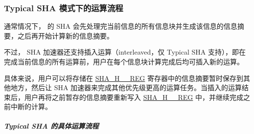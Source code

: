 \documentclass[main\_\_CN.tex]{subfiles}
\begin{document}
\subsubsection{Typical SHA 模式下的运算流程}\label{sec:sha-typical-sha}

通常情况下，\chipname{} 的 SHA 会先处理完当前信息的所有信息块并生成该信息的信息摘要，之后再开始计算新的信息摘要。

不过，\chipname{} SHA 加速器还支持插入运算（interleaved，仅 Typical SHA 支持），即在完成当前信息的所有运算前，用户在每个信息块计算完成后均可插入新的运算。

具体来说，用户可以将存储在 \hyperref[regdesc:SHAHNREG]{SHA\_H\_\_REG} 寄存器中的信息摘要暂时保存到其他地方，然后让 SHA 加速器来完成其他优先级更高的运算任务。当插入的运算结束后，用户再将之前暂存的信息摘要重新写入 \hyperref[regdesc:SHAHNREG]{SHA\_H\_\_REG} 中，并继续完成之前中断的计算。

\subparagraph{Typical SHA 的具体运算流程}
\end{document}
